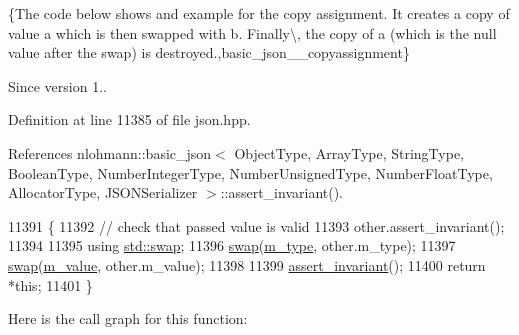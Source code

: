 \{The code below shows and example for the copy assignment. It creates a copy of value {\ttfamily a} which is then swapped with {\ttfamily b}. Finally\textbackslash{}, the copy of {\ttfamily a} (which is the null value after the swap) is destroyed.,basic\+\_\+json\+\_\+\+\_\+copyassignment\}

\begin{DoxySince}{Since}
version 1.. 
\end{DoxySince}


Definition at line 11385 of file json.\+hpp.



References nlohmann\+::basic\+\_\+json$<$ Object\+Type, Array\+Type, String\+Type, Boolean\+Type, Number\+Integer\+Type, Number\+Unsigned\+Type, Number\+Float\+Type, Allocator\+Type, J\+S\+O\+N\+Serializer $>$\+::assert\+\_\+invariant().


\begin{DoxyCode}
11391     \{
11392         \textcolor{comment}{// check that passed value is valid}
11393         other.assert\_invariant();
11394 
11395         \textcolor{keyword}{using} \hyperlink{json_8hpp_a907191b7578e209391ce938e3b2afdf7}{std::swap};
11396         \hyperlink{classnlohmann_1_1basic__json_a8c9d932353e1ab98a7dc2fc27e002031}{swap}(\hyperlink{classnlohmann_1_1basic__json_a91990b60d7d4d67968a2c1db677536e7}{m\_type}, other.m\_type);
11397         \hyperlink{classnlohmann_1_1basic__json_a8c9d932353e1ab98a7dc2fc27e002031}{swap}(\hyperlink{classnlohmann_1_1basic__json_aeb0814f76966f99290cb29e127c90a77}{m\_value}, other.m\_value);
11398 
11399         \hyperlink{classnlohmann_1_1basic__json_a4a82d3fb7a111641decf35c2fb707c7f}{assert\_invariant}();
11400         \textcolor{keywordflow}{return} *\textcolor{keyword}{this};
11401     \}
\end{DoxyCode}
Here is the call graph for this function\+:
\mbox{\label{classnlohmann_1_1basic__json_ac871e3b03fb2eeca9a8de4db2bea760f}} 
